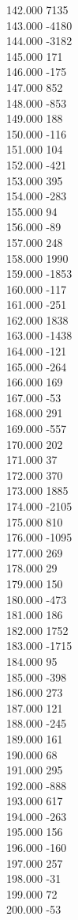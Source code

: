 { 142.000	7135 \\
 143.000	-4180 \\
 144.000	-3182 \\
 145.000	171 \\
 146.000	-175 \\
 147.000	852 \\
 148.000	-853 \\
 149.000	188 \\
 150.000	-116 \\
 151.000	104 \\
 152.000	-421 \\
 153.000	395 \\
 154.000	-283 \\
 155.000	94 \\
 156.000	-89 \\
 157.000	248 \\
 158.000	1990 \\
 159.000	-1853 \\
 160.000	-117 \\
 161.000	-251 \\
 162.000	1838 \\
 163.000	-1438 \\
 164.000	-121 \\
 165.000	-264 \\
 166.000	169 \\
 167.000	-53 \\
 168.000	291 \\
 169.000	-557 \\
 170.000	202 \\
 171.000	37 \\
 172.000	370 \\
 173.000	1885 \\
 174.000	-2105 \\
 175.000	810 \\
 176.000	-1095 \\
 177.000	269 \\
 178.000	29 \\
 179.000	150 \\
 180.000	-473 \\
 181.000	186 \\
 182.000	1752 \\
 183.000	-1715 \\
 184.000	95 \\
 185.000	-398 \\
 186.000	273 \\
 187.000	121 \\
 188.000	-245 \\
 189.000	161 \\
 190.000	68 \\
 191.000	295 \\
 192.000	-888 \\
 193.000	617 \\
 194.000	-263 \\
 195.000	156 \\
 196.000	-160 \\
 197.000	257 \\
 198.000	-31 \\
 199.000	72 \\
 200.000	-53 \\
}
